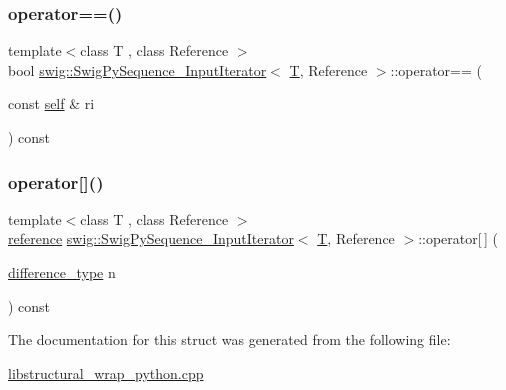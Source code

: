 \mbox{\label{structswig_1_1_swig_py_sequence___input_iterator_a7f8eb9c39c908b11833fdda6aa4d63fe}} 
\subsubsection{\texorpdfstring{operator==()}{operator==()}}
{\footnotesize\ttfamily template$<$class T , class Reference $>$ \\
bool \hyperlink{structswig_1_1_swig_py_sequence___input_iterator}{swig\+::\+Swig\+Py\+Sequence\+\_\+\+Input\+Iterator}$<$ \hyperlink{fmt_8h_a0acb682b8260ab1c60b918599864e2e5}{T}, Reference $>$\+::operator== (\begin{DoxyParamCaption}\item[{const \hyperlink{structswig_1_1_swig_py_sequence___input_iterator_a3d3f028d1d9af412c61de2b5d8630321}{self} \&}]{ri }\end{DoxyParamCaption}) const\hspace{0.3cm}{\ttfamily [inline]}}

\mbox{\label{structswig_1_1_swig_py_sequence___input_iterator_aac69219ece9efef26c9a171a6952ee94}} 
\subsubsection{\texorpdfstring{operator[]()}{operator[]()}}
{\footnotesize\ttfamily template$<$class T , class Reference $>$ \\
\hyperlink{structswig_1_1_swig_py_sequence___input_iterator_a75f82d558aaa6781b77d34914eb0f455}{reference} \hyperlink{structswig_1_1_swig_py_sequence___input_iterator}{swig\+::\+Swig\+Py\+Sequence\+\_\+\+Input\+Iterator}$<$ \hyperlink{fmt_8h_a0acb682b8260ab1c60b918599864e2e5}{T}, Reference $>$\+::operator\mbox{[}$\,$\mbox{]} (\begin{DoxyParamCaption}\item[{\hyperlink{structswig_1_1_swig_py_sequence___input_iterator_af5e5d3f2d1906ceaf05c2215ee388096}{difference\+\_\+type}}]{n }\end{DoxyParamCaption}) const\hspace{0.3cm}{\ttfamily [inline]}}



The documentation for this struct was generated from the following file\+:\begin{DoxyCompactItemize}
\item 
\hyperlink{libstructural__wrap__python_8cpp}{libstructural\+\_\+wrap\+\_\+python.\+cpp}\end{DoxyCompactItemize}
